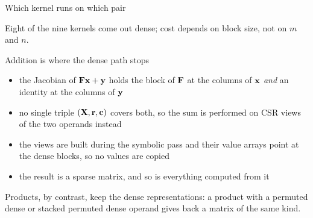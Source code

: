 \documentclass[10pt,mathserif,aspectratio=169]{beamer}
\newcommand{\bul}{\setlength\itemsep{1.1ex}}
\begin{document}
\begin{frame}[label=bk-dispatch]{Which kernel runs on which pair}
\vspace{-1ex}
\begin{center}\small\color{polyblue}
Eight of the nine kernels come out dense; cost depends on block size, not on $m$ and $n$.
\end{center}
\end{frame}

\begin{frame}[label=bk-addition]{Addition is where the dense path stops}
\vspace{-0.5ex}
\begin{itemize}\small\bul
  \item the Jacobian of $\mathbf{F}\mathbf{x} + \mathbf{y}$ holds the block of $\mathbf{F}$ at the
        columns of $\mathbf{x}$ \emph{and} an identity at the columns of $\mathbf{y}$
  \item no single triple $(\mathbf{X}, \mathbf{r}, \mathbf{c})$ covers both, so the sum is performed
        on CSR views of the two operands instead
  \item the views are built during the symbolic pass and their value arrays point at the dense
        blocks, so {\color{polyblue}no values are copied}
  \item the result is a sparse matrix, and so is everything computed from it
\end{itemize}

\vspace{2ex}
\begin{center}\small
Products, by contrast, keep the dense representations: a product with a permuted dense or
stacked permuted dense operand gives back a matrix of the same kind.
\end{center}
\end{frame}
\end{document}
